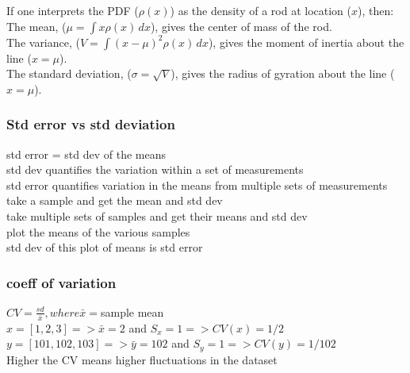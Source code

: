 \documentclass{beamer}
\begin{document}
\begin{frame}
If one interprets the PDF ($\rho(x)$) as the density of a rod at location ($x$), then:\\

The mean, ($\mu = \int x\rho(x)\,dx$), gives the center of mass of the rod.\\
The variance, ($V = \int (x-\mu)^2\rho(x)\,dx$), gives the moment of inertia about the line ($x = \mu$).\\
The standard deviation, ($\sigma = \sqrt{V}$), gives the radius of gyration about the line ($x = \mu$).

\end{frame}

\begin{frame}\frametitle{Std error vs std deviation}
std error = std dev of the means\\
std dev quantifies the variation within a set of measurements\\
std error quantifies variation in the means from multiple sets of measurements\\
take a sample and get the mean and std dev\\
take multiple sets of samples and get their means and std dev\\
plot the means of the various samples\\
std dev of this plot of means is std error
\end{frame}


\begin{frame}\frametitle{coeff of variation}
$CV = \frac{sd}{\bar{x}}, where  \bar{x}=$sample mean \\
$x = [1,2,3] => \bar{x}=2$ and $S_x=1 => CV(x)=1/2 $\\
$y = [101,102,103] => \bar{y}=102$ and $S_y=1 => CV(y)=1/102 $\\
Higher the CV means higher fluctuations in the dataset\\

\end{frame}
\end{document}
